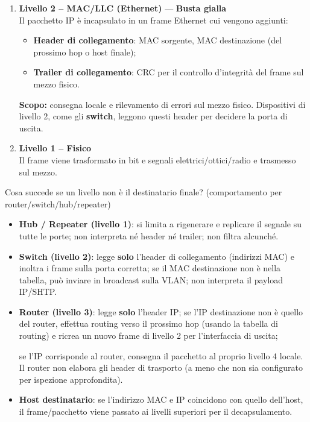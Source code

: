 \documentclass[a4paper,12pt]{report}
\begin{document}
\begin{enumerate}
\item \textbf{Livello 2 -- MAC/LLC (Ethernet)} — \textcolor{yellow!80!black}{\textbf{Busta gialla}}\\
Il pacchetto IP è incapsulato in un frame Ethernet cui vengono aggiunti:
\begin{itemize}
    \item \textbf{Header di collegamento}: MAC sorgente, MAC destinazione (del prossimo hop o host finale);
    \item \textbf{Trailer di collegamento}: CRC per il controllo d’integrità del frame sul mezzo fisico.
\end{itemize}
\textbf{Scopo:} consegna locale e rilevamento di errori sul mezzo fisico. Dispositivi di livello 2, come gli \textbf{switch}, leggono questi header per decidere la porta di uscita.

\item \textbf{Livello 1 -- Fisico}\\
Il frame viene trasformato in bit e segnali elettrici/ottici/radio e trasmesso sul mezzo.

\end{enumerate}

\begin{notebox}{Cosa succede se un livello non è il destinatario finale? (comportamento per router/switch/hub/repeater)}
\begin{itemize}
\item \textbf{Hub / Repeater (livello 1)}: si limita a rigenerare e replicare il segnale su tutte le porte; non interpreta né header né trailer; non filtra alcunché.
\item \textbf{Switch (livello 2)}: legge \textbf{solo} l’header di collegamento (indirizzi MAC) e inoltra i frame sulla porta corretta; se il MAC destinazione non è nella tabella, può inviare in broadcast sulla VLAN; non interpreta il payload IP/SHTP.
\item \textbf{Router (livello 3)}: legge \textbf{solo} l’header IP; se l’IP destinazione non è quello del router, effettua routing verso il prossimo hop (usando la tabella di routing) e ricrea un nuovo frame di livello 2 per l’interfaccia di uscita; 

se l’IP corrisponde al router, consegna il pacchetto al proprio livello 4 locale. Il router non elabora gli header di trasporto (a meno che non sia configurato per ispezione approfondita).
\item \textbf{Host destinatario}: se l’indirizzo MAC e IP coincidono con quello dell’host, il frame/pacchetto viene passato ai livelli superiori per il decapsulamento.
\end{itemize}    
\end{notebox}
\end{document}

